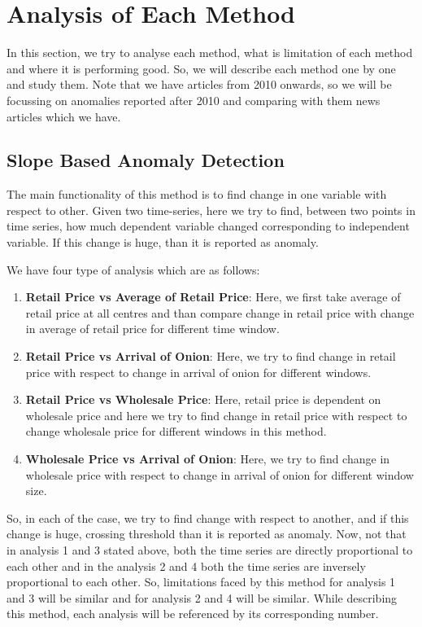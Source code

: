 \documentclass[a4paper,10pt]{report}
\begin{document}
	
\section{Analysis of Each Method}

In this section, we try to analyse each method, what is limitation of each method and where it is performing good. So, we will describe each method one by one and study them. Note that we have articles from 2010 onwards, so we will be focussing on anomalies reported after 2010 and comparing with them news articles which we have.

\subsection{Slope Based Anomaly Detection}
	
		The main functionality of this method is to find change in one variable with respect to other. Given two time-series, here we try to find, between two points in time series, how much dependent variable changed corresponding to independent variable. If this change is huge, than it is reported as anomaly.
		
		We have four type of analysis which are as follows:
		\begin{enumerate}
			\item \textbf{Retail Price vs Average of Retail Price}: Here, we first take average of retail price at all centres and than compare change in retail price with change in average of retail price for different time window.			
			\item \textbf{Retail Price vs Arrival of Onion}: Here, we try to find change in retail price with respect to change in arrival of onion for different windows. 
			\item \textbf{Retail Price vs Wholesale Price}: Here, retail price is dependent on wholesale price and here we try to find change in retail price with respect to change wholesale price for different windows in this method.
			\item \textbf{Wholesale Price vs Arrival of Onion}: Here, we try to find change in wholesale price with respect to change in arrival of onion for different window size.
		\end{enumerate}
		
		So, in each of the case, we try to find change with respect to another, and if this change is huge, crossing threshold than it is reported as anomaly. Now, not that in analysis 1 and 3 stated above, both the time series are directly proportional to each other and in the analysis 2 and 4 both the time series are inversely proportional to each other. So, limitations faced by this method for analysis 1 and 3 will be similar and for analysis 2 and 4 will be similar. While describing this method, each analysis will be referenced by its corresponding number.
		
\end{document}

